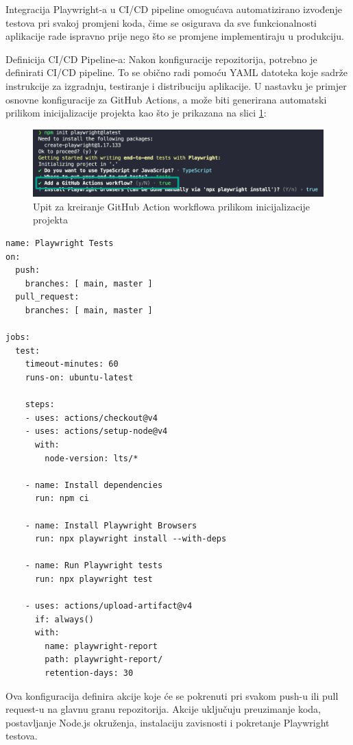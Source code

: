 
Integracija Playwright-a u CI/CD pipeline omogućava automatizirano izvođenje testova pri svakoj promjeni koda, čime se osigurava da sve funkcionalnosti aplikacije rade ispravno prije nego što se promjene implementiraju u produkciju.

Definicija CI/CD Pipeline-a: Nakon konfiguracije repozitorija, potrebno je definirati CI/CD pipeline. To se obično radi pomoću YAML datoteka koje sadrže instrukcije za izgradnju, testiranje i distribuciju aplikacije. U nastavku je primjer osnovne konfiguracije za GitHub Actions, a može biti generirana automatski prilikom inicijalizacije projekta kao što je prikazana na slici \ref{img:ghActionPrompt}:

\begin{figure}[!h]\begin{center}
  \includegraphics[width=1\textwidth]{"img/ghActionPrompt"}
  \caption{Upit za kreiranje GitHub Action workflowa prilikom inicijalizacije projekta}\label{img:ghActionPrompt}
\end{center}\end{figure}

\begin{verbatim}
name: Playwright Tests
on:
  push:
    branches: [ main, master ]
  pull_request:
    branches: [ main, master ]

jobs:
  test:
    timeout-minutes: 60
    runs-on: ubuntu-latest

    steps:
    - uses: actions/checkout@v4
    - uses: actions/setup-node@v4
      with:
        node-version: lts/*

    - name: Install dependencies
      run: npm ci

    - name: Install Playwright Browsers
      run: npx playwright install --with-deps

    - name: Run Playwright tests
      run: npx playwright test

    - uses: actions/upload-artifact@v4
      if: always()
      with:
        name: playwright-report
        path: playwright-report/
        retention-days: 30
\end{verbatim}
Ova konfiguracija definira akcije koje će se pokrenuti pri svakom push-u ili pull request-u na glavnu granu repozitorija. Akcije uključuju preuzimanje koda, postavljanje Node.js okruženja, instalaciju zavisnosti i pokretanje Playwright testova.


